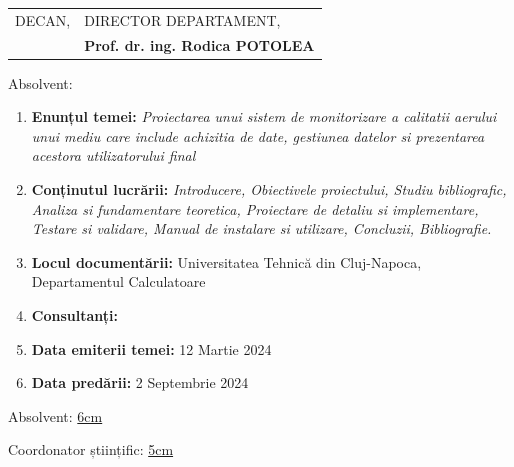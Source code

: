\begin{tabular}{p{7cm}p{8cm}}
	\hspace{-1cm}DECAN, & DIRECTOR DEPARTAMENT,\\
	\hspace{-1cm}{\bf Prof. dr. ing. Mihaela DÎNȘOREANU} & {\bf Prof. dr. ing. Rodica POTOLEA}\\  
\end{tabular}

\vspace{2cm}

\begin{center}
	Absolvent: {\bf \thesisauthor}
	
	\vspace{1cm}
	
	{\bf \thesistitle}
\end{center}

\vspace{5mm}
\begin{enumerate}
	\item {\bf Enunțul temei:} {\it Proiectarea unui sistem de monitorizare a calitatii aerului unui mediu care include achizitia de date, gestiunea datelor 
	si prezentarea acestora utilizatorului final}
	\item {\bf Conținutul lucrării:} {\it Introducere, Obiectivele proiectului, Studiu bibliografic, Analiza si fundamentare teoretica, Proiectare de detaliu si 
	implementare, Testare si validare, Manual de instalare si utilizare, Concluzii, Bibliografie.}
	\item {\bf Locul documentării:} Universitatea Tehnică din Cluj-Napoca, Departamentul Calculatoare
	\item {\bf Consultanți:}
	\item {\bf Data emiterii temei:} 12 Martie 2024 %
	\item {\bf Data predării:} 2 Septembrie 2024 %
\end{enumerate}
\vspace{1.2cm}

\hspace{6cm} Absolvent: \uline{6cm} 

\vspace{0.5cm}
\hspace{6cm} Coordonator științific: \uline{5cm} 
\newpage
\begin{center}
	{\department}
\end{center}
\vspace{0.5cm}

